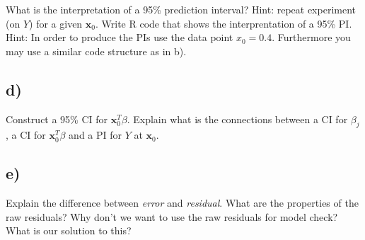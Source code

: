 \documentclass[
]{article}
\begin{document}
What is the interpretation of a 95\% prediction interval? Hint: repeat
experiment (on \(Y\)) for a given \({\boldsymbol x}_0\). Write R code
that shows the interprentation of a 95\% PI. Hint: In order to produce
the PIs use the data point \(x_0 = 0.4.\) Furthermore you may use a
similar code structure as in b).

\hypertarget{d-1}{%
\subsection{d)}\label{d-1}}

Construct a 95\% CI for \({\boldsymbol x}_0^T \beta\). Explain what is
the connections between a CI for \(\beta_j\), a CI for
\({\boldsymbol x}_0^T \beta\) and a PI for \(Y\) at
\({\boldsymbol x}_0\).

\hypertarget{e-1}{%
\subsection{e)}\label{e-1}}

Explain the difference between \emph{error} and \emph{residual}. What
are the properties of the raw residuals? Why don't we want to use the
raw residuals for model check? What is our solution to this?
\end{document}

